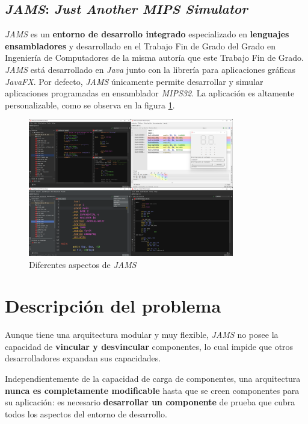 \subsection{\textit{JAMS}: \textit{Just Another MIPS Simulator}}
\label{subsec:jams-just-another-mips-simulator}

\textit{JAMS}\cite{JAMS} es un \textbf{entorno de desarrollo integrado} especializado
en \textbf{lenguajes ensambladores} y desarrollado en el Trabajo Fin de Grado
del Grado en Ingeniería de Computadores de la misma
autoría que este Trabajo Fin de Grado.
\textit{JAMS} está desarrollado en \textit{Java}\cite{JAVA} junto
con la librería para aplicaciones gráficas \textit{JavaFX}\cite{JAVAFX}.
Por defecto, \textit{JAMS} únicamente permite desarrollar y simular
aplicaciones programadas en ensamblador \textit{MIPS32}.
La aplicación es altamente personalizable, como se observa en la figura \ref{fig:jams-collage}.

\begin{figure}[h]
    \centering
    \includegraphics[width=0.8\textwidth]{images/introduction/jams-collage}
    \caption{Diferentes aspectos de \textit{JAMS}}
    \label{fig:jams-collage}
\end{figure}

\section{Descripción del problema}\label{sec:descripcion-del-problema}

Aunque tiene una arquitectura modular y muy flexible, \textit{JAMS}
no posee la capacidad de \textbf{vincular y desvincular}
componentes, lo cual impide que otros desarrolladores expandan sus capacidades.

Independientemente de la capacidad de carga de componentes,
una arquitectura \textbf{nunca es completamente modificable} hasta que
se creen componentes para su aplicación: es necesario
\textbf{desarrollar un componente} de prueba que cubra
todos los aspectos del entorno de desarrollo.

